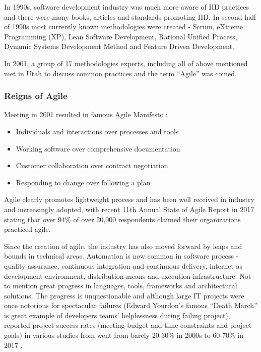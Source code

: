 \documentclass{article}
\begin{document}
In 1990s, software development industry was much more aware of IID practices and there were many books, articles and standards promoting IID. In second half of 1990s most currently known methodologies were created - Scrum, eXtreme Programming (XP), Lean Software Development, Rational Unified Process, Dynamic Systems Development Method and Feature Driven Development.

In 2001, a group of 17 methodologies experts, including all of above mentioned met in Utah to discuss common practices and the term ``Agile'' was coined.

\subsubsection{Reigns of Agile}

Meeting in 2001 resulted in famous Agile Manifesto \cite{beck2001agile}:
\begin{itemize}
  \item Individuals and interactions over processes and tools
  \item Working software over comprehensive documentation
  \item Customer collaboration over contract negotiation
  \item Responding to change over following a plan
\end{itemize}

Agile clearly promotes lightweight process and has been well received in industry and increasingly adopted, with recent 11th Annual State of Agile Report in 2017 \cite{one201711th} stating that over 94\% of over 20,000 respondents claimed their organizations practiced agile.

Since the creation of agile, the industry has also moved forward by leaps and bounds in technical areas. Automation is now common in software process - quality assurance, continuous integration and continuous delivery, internet as development environment, distribution means and execution infrastructure. Not to mention great progress in languages, tools, frameworks and architectural solutions. \cite{fuggetta2014software}
The progress is unquestionable and although large IT projects were once notorious for spectacular failures (Edward Yourdon's famous ``Death March'' \cite{yourdon1997death} is great example of developers teams' helplessness during failing project), reported project success rates (meeting budget and time constraints and project goals) in various studies from went from barely 20-30\% in 2000s \cite{kaur2013software} to 60-70\% in 2017 \cite{pmi2017pulse}.
\end{document}
